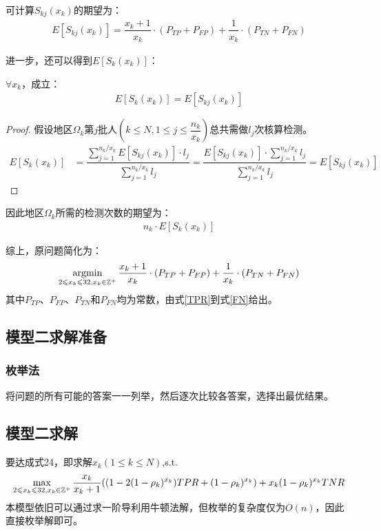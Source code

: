 \documentclass[withoutpreface,bwprint]{cumcmthesis} %
\begin{document}
可计算$ S_{kj}(x_k)$的期望为：
\begin{align*}
    E[S_{kj}(x_k)]=\dfrac{x_k+1}{x_k}\cdot (P_{TP}+P_{FP})+\dfrac{1}{x_k}\cdot (P_{TN}+P_{FN})
\end{align*}

进一步，还可以得到$E[S_k(x_k)]$：
\begin{theorem}
\label{thm-1}
$\forall x_k$，成立：
\begin{align}
    E[S_k(x_k)]=E[S_{kj}(x_k)]
\end{align}
\end{theorem}

\begin{proof}
    假设地区$\Omega_k$第$j$批人$(k\leqslant N,1 \leqslant j \leqslant \dfrac{n_k}{x_k})$总共需做$l_j$次核算检测。
    \begin{align*}
        E[S_k(x_k)]&=\dfrac{\sum\limits^{n_k/x_k}_{j=1} E[S_{kj}(x_k)]\cdot l_j }{\sum\limits^{n_k/x_k}_{j=1} l_j}  
        =\dfrac{E[S_{kj}(x_k)]\cdot \sum\limits^{n_k/x_k}_{j=1} l_j }{\sum\limits^{n_k/x_k}_{j=1} l_j}
        =E[S_{kj}(x_k)]
    \end{align*}
\end{proof}

因此地区$\Omega_k$所需的检测次数的期望为：
\begin{align}
    {n_k}\cdot{E[S_k(x_k)]}
\end{align}

综上，原问题简化为：
\begin{align}
\label{OMG}
    \operatorname*{\rm argmin}_{2\leqslant x_k \leqslant 32,x_k\in\mathbb{Z}^+}\dfrac{x_k+1}{x_k}\cdot (P_{TP}+P_{FP})+\dfrac{1}{x_k}\cdot (P_{TN}+P_{FN})
\end{align}
其中$P_{TP}$、$P_{FP}$、$P_{TN}$和$P_{FN}$均为常数，由式\ref{TPR}到式\ref{FN}给出。%

\subsection{模型二求解准备}
\subsubsection{枚举法}
将问题的所有可能的答案一一列举，然后逐次比较各答案，选择出最优结果。\cite{bib3}
\subsection{模型二求解}
要达成式24，即求解$x_k(1\leqslant k \leqslant N)$,s.t.
\begin{align}
    \operatorname*{\rm max}_{2\leqslant x_k \leqslant 32,x_k\in\mathbb{Z}^+}\dfrac{x_k}{x_k+1} ( (1-2(1-\rho_k)^{x_k})TPR+ (1-\rho_k)^{x_k})+x_k (1-\rho_k)^{x_k} TNR
\end{align}
本模型依旧可以通过求一阶导利用牛顿法解，但枚举的复杂度仅为$O(n)$，因此直接枚举解即可。
\end{document}
